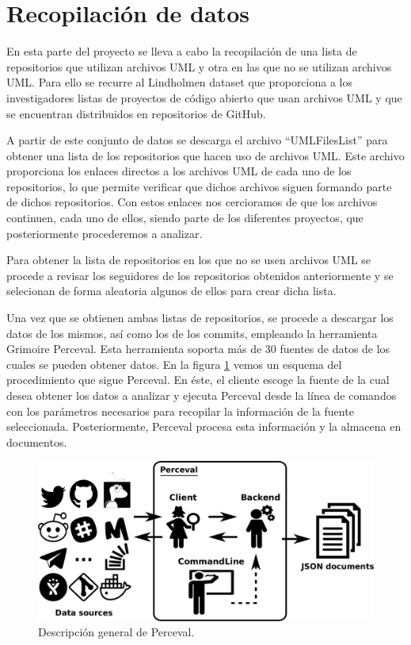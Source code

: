 \documentclass[a4paper, 12pt]{book}
\begin{document}
\section{Recopilación de datos} %
\label{sec:recopilación de datos}

En esta parte del proyecto se lleva a cabo la recopilación de una lista de repositorios que utilizan archivos UML y otra en las que no se utilizan archivos UML.
Para ello se recurre al Lindholmen dataset que proporciona a los investigadores listas de proyectos de código abierto que usan archivos UML y que se encuentran distribuidos en repositorios de GitHub.

A partir de este conjunto de datos se descarga el archivo ``UMLFilesList'' para obtener una lista de los repositorios que hacen uso de archivos UML.
Este archivo proporciona los enlaces directos a los archivos UML de cada uno de los repositorios, lo que permite verificar que dichos archivos siguen formando parte de dichos repositorios.
Con estos enlaces nos cercioramos de que los archivos continuen, cada uno de ellos, siendo parte de los diferentes proyectos, que posteriormente procederemos a analizar. 


Para obtener la lista de repositorios en los que no se usen archivos UML se procede a revisar los seguidores de los repositorios obtenidos anteriormente y se selecionan de forma aleatoria algunos de ellos para crear dicha lista.


Una vez que se obtienen ambas listas de repositorios, se procede a descargar los datos de los mismos, así como los de los commits, empleando la herramienta Grimoire Perceval.
Esta herramienta soporta más de 30 fuentes de datos de los cuales se pueden obtener datos.
En la figura \ref{fig:perceval-json} vemos un esquema del procedimiento que sigue Perceval. 
En éste, el cliente escoge la fuente de la cual desea obtener los datos a analizar y ejecuta Perceval desde la línea de comandos con los parámetros necesarios para recopilar la información de la fuente seleccionada.
Posteriormente, Perceval procesa esta información y la almacena en documentos. 

\begin{figure}
  \centering
  \includegraphics[width=12cm, keepaspectratio]{img/perceval-json.png}
  \caption{Descripción general de Perceval.}\label{fig:perceval-json}
\end{figure}
\end{document}
